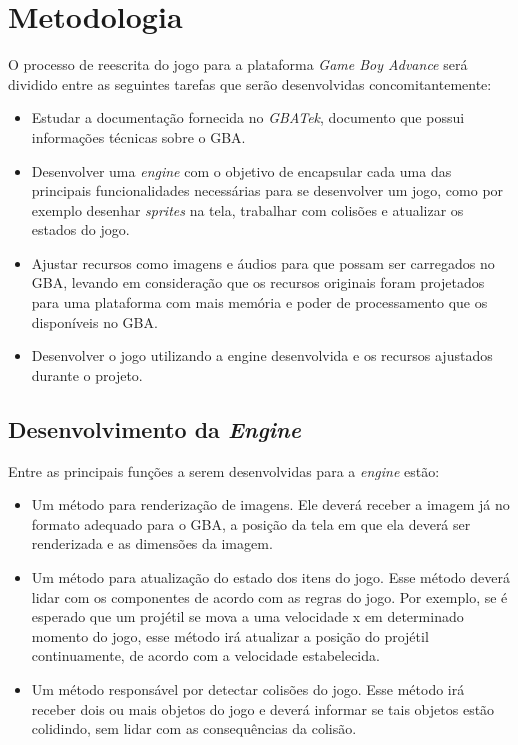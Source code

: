 \chapter[Metodologia]{Metodologia}

O processo de reescrita do jogo para a plataforma \textit{Game Boy Advance} será dividido entre as seguintes tarefas que serão desenvolvidas concomitantemente:

\begin{itemize}
\item Estudar a documentação fornecida no \textit{GBATek}, documento que possui informações técnicas sobre o GBA.

\item Desenvolver uma \textit{engine} com o objetivo de encapsular cada uma das principais funcionalidades necessárias para se desenvolver um jogo, como por exemplo desenhar \textit{sprites} na tela, trabalhar com colisões e atualizar os estados do jogo.

\item Ajustar recursos como imagens e áudios para que possam ser carregados no GBA, levando em consideração que os recursos originais foram projetados para uma plataforma com mais memória e poder de processamento que os disponíveis no GBA.

\item Desenvolver o jogo utilizando a engine desenvolvida e os recursos ajustados durante o projeto.
\end{itemize}

\section{Desenvolvimento da \textit{Engine}}

Entre as principais funções a serem desenvolvidas para a \textit{engine} estão:

\begin{itemize}
\item Um método para renderização de imagens. Ele deverá receber a imagem já no formato adequado para o GBA, a posição da tela em que ela deverá ser renderizada e as dimensões da imagem.

\item Um método para atualização do estado dos itens do jogo. Esse método deverá lidar com os componentes de acordo com as regras do jogo. Por exemplo, se é esperado que um projétil se mova a uma velocidade x em determinado momento do jogo, esse método irá atualizar a posição do projétil continuamente, de acordo com a velocidade estabelecida.

\item Um método responsável por detectar colisões do jogo. Esse método irá receber dois ou mais objetos do jogo e deverá informar se tais objetos estão colidindo, sem lidar com as consequências da colisão.
\end{itemize}


